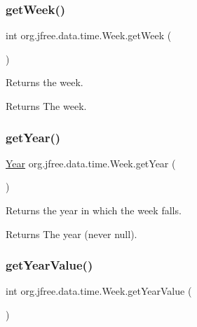 \subsubsection{\texorpdfstring{get\+Week()}{getWeek()}}
{\footnotesize\ttfamily int org.\+jfree.\+data.\+time.\+Week.\+get\+Week (\begin{DoxyParamCaption}{ }\end{DoxyParamCaption})}

Returns the week.

\begin{DoxyReturn}{Returns}
The week. 
\end{DoxyReturn}
\mbox{\label{classorg_1_1jfree_1_1data_1_1time_1_1_week_aa8fe36021f0f4880f6658d19ec6aaeea}} 
\subsubsection{\texorpdfstring{get\+Year()}{getYear()}}
{\footnotesize\ttfamily \mbox{\hyperlink{classorg_1_1jfree_1_1data_1_1time_1_1_year}{Year}} org.\+jfree.\+data.\+time.\+Week.\+get\+Year (\begin{DoxyParamCaption}{ }\end{DoxyParamCaption})}

Returns the year in which the week falls.

\begin{DoxyReturn}{Returns}
The year (never {\ttfamily null}). 
\end{DoxyReturn}
\mbox{\label{classorg_1_1jfree_1_1data_1_1time_1_1_week_ad22101142151e76f4c8d446528ce2024}} 
\subsubsection{\texorpdfstring{get\+Year\+Value()}{getYearValue()}}
{\footnotesize\ttfamily int org.\+jfree.\+data.\+time.\+Week.\+get\+Year\+Value (\begin{DoxyParamCaption}{ }\end{DoxyParamCaption})}

